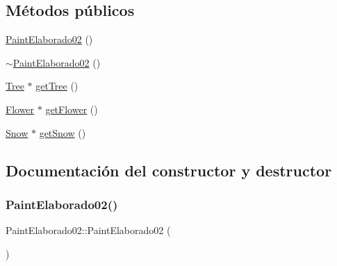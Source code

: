 \subsection*{Métodos públicos}
\begin{DoxyCompactItemize}
\item 
\mbox{\hyperlink{class_paint_elaborado02_a061ffb2f8ba3a52f11488af1bd6d41b6}{Paint\+Elaborado02}} ()
\item 
\mbox{\hyperlink{class_paint_elaborado02_a44b8f3e545f3b35fb0103ceb1d4fbb43}{$\sim$\+Paint\+Elaborado02}} ()
\item 
\mbox{\hyperlink{class_tree}{Tree}} $\ast$ \mbox{\hyperlink{class_paint_elaborado02_af943b1fe3a9f276a8780e937150a3ff8}{get\+Tree}} ()
\item 
\mbox{\hyperlink{class_flower}{Flower}} $\ast$ \mbox{\hyperlink{class_paint_elaborado02_a8419fd52c4695f73b0b0ade31450f0ff}{get\+Flower}} ()
\item 
\mbox{\hyperlink{class_snow}{Snow}} $\ast$ \mbox{\hyperlink{class_paint_elaborado02_ab2e3d866b6b3a650b7cb1ca7186ec3a3}{get\+Snow}} ()
\end{DoxyCompactItemize}


\subsection{Documentación del constructor y destructor}
\mbox{\label{class_paint_elaborado02_a061ffb2f8ba3a52f11488af1bd6d41b6}} 
\subsubsection{\texorpdfstring{PaintElaborado02()}{PaintElaborado02()}}
{\footnotesize\ttfamily Paint\+Elaborado02\+::\+Paint\+Elaborado02 (\begin{DoxyParamCaption}{ }\end{DoxyParamCaption})\hspace{0.3cm}{\ttfamily [inline]}}

\mbox{\label{class_paint_elaborado02_a44b8f3e545f3b35fb0103ceb1d4fbb43}} 
